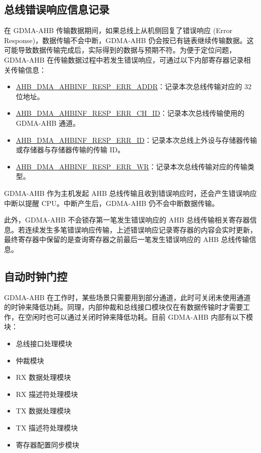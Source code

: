 \documentclass[main\_\_CN.tex]{subfiles}
\begin{document}
\subsection{总线错误响应信息记录}\label{sec:dma-bus-error-resp}

在 GDMA-AHB 传输数据期间，如果总线上从机侧回复了错误响应 (Error Response)，数据传输不会中断，GDMA-AHB 仍会按已有链表继续传输数据。这可能导致数据传输完成后，实际得到的数据与预期不符。为便于定位问题，GDMA-AHB 在传输数据过程中若发生错误响应，可通过以下内部寄存器记录相关传输信息：

\begin{itemize}
    \item \hyperref[fielddesc:AHBDMAAHBINFRESPERRADDR]{AHB\_DMA\_AHBINF\_RESP\_ERR\_ADDR}：记录本次总线传输对应的 32 位地址。
    \item \hyperref[fielddesc:AHBDMAAHBINFRESPERRCHID]{AHB\_DMA\_AHBINF\_RESP\_ERR\_CH\_ID}：记录本次总线传输使用的 GDMA-AHB 通道。
    \item \hyperref[fielddesc:AHBDMAAHBINFRESPERRID]{AHB\_DMA\_AHBINF\_RESP\_ERR\_ID}：记录本次总线上外设与存储器传输或存储器与存储器传输的传输 ID。
    \item \hyperref[fielddesc:AHBDMAAHBINFRESPERRWR]{AHB\_DMA\_AHBINF\_RESP\_ERR\_WR}：记录本次总线传输对应的传输类型。
\end{itemize}

GDMA-AHB 作为主机发起 AHB 总线传输且收到错误响应时，还会产生错误响应中断以提醒 CPU。中断产生后，GDMA-AHB 仍不会中断数据传输。

此外，GDMA-AHB 不会锁存第一笔发生错误响应的 AHB 总线传输相关寄存器信息。若连续发生多笔错误响应传输，上述错误响应记录寄存器的内容会实时更新，最终寄存器中保留的是查询寄存器之前最后一笔发生错误响应的 AHB 总线传输信息。

\subsection{自动时钟门控}\label{sec:dma-auto-clk-gating}

GDMA-AHB 在工作时，某些场景只需要用到部分通道，此时可关闭未使用通道的时钟来降低功耗。同理，内部仲裁和总线接口模块仅在有数据传输时才需要工作，在空闲时也可以通过关闭时钟来降低功耗。目前 GDMA-AHB 内部有以下模块：
\begin{itemize}
    \item 总线接口处理模块
    \item 仲裁模块
    \item RX 数据处理模块
    \item RX 描述符处理模块
    \item TX 数据处理模块
    \item TX 描述符处理模块
    \item 寄存器配置同步模块
\end{itemize}
\end{document}

